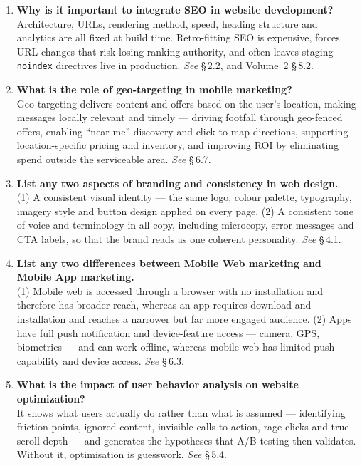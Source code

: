 \begin{enumerate}[leftmargin=2.2em,itemsep=1.1ex]
\item \textbf{Why is it important to integrate SEO in website development?}
      \\
      Architecture, URLs, rendering method, speed, heading structure and analytics
      are all fixed at build time. Retro-fitting SEO is expensive, forces URL
      changes that risk losing ranking authority, and often leaves staging
      \texttt{noindex} directives live in production.
      \hfill\emph{See} \S\,2.2, and Volume~2 \S\,8.2.

\item \textbf{What is the role of geo-targeting in mobile marketing?}
      \\
      Geo-targeting delivers content and offers based on the user's location,
      making messages locally relevant and timely --- driving footfall through
      geo-fenced offers, enabling ``near me'' discovery and click-to-map
      directions, supporting location-specific pricing and inventory, and
      improving ROI by eliminating spend outside the serviceable area.
      \hfill\emph{See} \S\,6.7.

\item \textbf{List any two aspects of branding and consistency in web design.}
      \\
      (1) A consistent visual identity --- the same logo, colour palette,
      typography, imagery style and button design applied on every page. (2) A
      consistent tone of voice and terminology in all copy, including microcopy,
      error messages and CTA labels, so that the brand reads as one coherent
      personality. \hfill\emph{See} \S\,4.1.

\item \textbf{List any two differences between Mobile Web marketing and Mobile App
      marketing.} \\
      (1) Mobile web is accessed through a browser with no installation and
      therefore has broader reach, whereas an app requires download and
      installation and reaches a narrower but far more engaged audience. (2) Apps
      have full push notification and device-feature access --- camera, GPS,
      biometrics --- and can work offline, whereas mobile web has limited push
      capability and device access. \hfill\emph{See} \S\,6.3.

\item \textbf{What is the impact of user behavior analysis on website
      optimization?} \\
      It shows what users actually do rather than what is assumed --- identifying
      friction points, ignored content, invisible calls to action, rage clicks and
      true scroll depth --- and generates the hypotheses that A/B testing then
      validates. Without it, optimisation is guesswork.
      \hfill\emph{See} \S\,5.4.

\end{enumerate}

